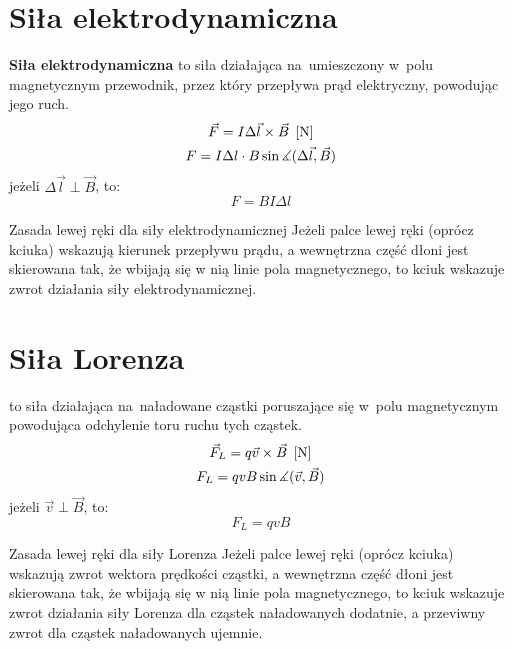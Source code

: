   \section{Siła elektrodynamiczna}
    \begin{definition}
      \textbf{Siła elektrodynamiczna} to siła działająca na~umieszczony w~polu magnetycznym przewodnik, przez który przepływa prąd elektryczny, powodując jego ruch.
      \begin{gather*}
          \vec F = I\Delta\vec l\times\vec B \;\left[\mathrm{N}\right]\\
          F = I\Delta l\cdot B\sin\measuredangle(\Delta\vec l, \vec B)
      \end{gather*}
      jeżeli $\Delta\vec l \perp \vec B$, to:
      \begin{equation}
        \boxed{F = BI\Delta l}
      \end{equation}
    \end{definition}
    \begin{law}{Zasada lewej ręki dla siły elektrodynamicznej}
      Jeżeli palce lewej ręki (oprócz kciuka) wskazują kierunek przepływu prądu, a wewnętrzna część dłoni jest skierowana tak, że wbijają się w nią linie pola magnetycznego, to kciuk wskazuje zwrot działania siły elektrodynamicznej.
    \end{law}

  \section{Siła Lorenza}
    \begin{definition}
       to siła działająca na~naładowane cząstki poruszające się w~polu magnetycznym powodująca odchylenie toru ruchu tych cząstek.
    \begin{gather*}
      \vec F_L = q\vec v\times\vec B \;\left[\mathrm{N}\right]\\
      F_L = qvB\sin\measuredangle(\vec v, \vec B)
    \end{gather*}
    jeżeli $\vec v\perp\vec B$, to:
    \begin{equation}
      \boxed{F_L = qvB}
    \end{equation}
    \end{definition}
    \begin{law}{Zasada lewej ręki dla siły Lorenza}
      Jeżeli palce lewej ręki (oprócz kciuka) wskazują zwrot wektora prędkości cząstki, a wewnętrzna część dłoni jest skierowana tak, że wbijają się w nią linie pola magnetycznego, to kciuk wskazuje zwrot działania siły Lorenza dla cząstek naładowanych dodatnie, a przeviwny zwrot dla cząstek naładowanych ujemnie.
    \end{law}

